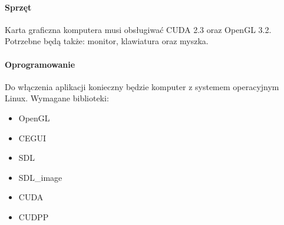 \paragraph{Sprzęt}
Karta graficzna komputera musi obsługiwać CUDA 2.3 oraz OpenGL 3.2. Potrzebne będą także: monitor, klawiatura oraz myszka.

\paragraph{Oprogramowanie}
Do włączenia aplikacji konieczny będzie komputer z systemem operacyjnym Linux. Wymagane biblioteki: 
\begin{itemize}
\item{OpenGL}
\item{CEGUI}
\item{SDL}
\item{SDL\_image}
\item{CUDA}
\item{CUDPP}
\end{itemize}


